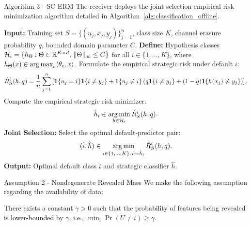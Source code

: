 \begin{sourceblock}{Algorithm 3 - SC-ERM}
The receiver deploys the joint selection empirical risk minimization algorithm detailed in Algorithm~\ref{alg:classification_offline}.

\begin{algorithm}[htbp]
\caption{Strategic Classification Empirical Risk Minimization (SC-ERM)}
\label{alg:classification_offline}
\begin{algorithmic}[1]
\State \textbf{Input:} Training set $S = \{(u_j, x_j, y_j)\}_{j=1}^n$, class size $K$, channel erasure probability $q$, bounded domain parameter $C$.
\State \textbf{Define:} Hypothesis classes $\mathcal{H}_i = \{h_{\Theta} : \Theta \in \mathbb{R}^{K \times d}, \, \|\Theta\|_\infty \le C\}$ for all $i \in \{1,\dots,K\}$, where $h_{\Theta}(x) \in \operatorname*{arg\,max}_c \langle \theta_c, x \rangle$.
    \State Formulate the empirical strategic risk under default $i$:
    \begin{equation*}
        \hat{R}^i_S(h, q) = \frac{1}{n}\sum_{j=1}^n \left[ \mathbf{1}\{u_j = i\}\mathbf{1}\{i \ne y_j\} + \mathbf{1}\{u_j \ne i\} \left( q\mathbf{1}\{i \ne y_j\} + (1 - q)\mathbf{1}\{h(x_j) \ne y_j\} \right) \right].
    \end{equation*}
    \State Compute the empirical strategic risk minimizer:
    \begin{equation*}
        \hat{h}_i \in \operatorname*{arg\,min}_{h \in \mathcal{H}_i} \hat{R}^i_S(h, q).
    \end{equation*}
\EndFor
\State \textbf{Joint Selection:} Select the optimal default-predictor pair:
\begin{equation*}
    (\hat{i}, \hat{h}) \in \operatorname*{arg\,min}_{i \in \{1, \dots, K\}, \, h = \hat{h}_i} \hat{R}^i_S(h, q).
\end{equation*}
\State \textbf{Output:} Optimal default class $\hat{i}$ and strategic classifier $\hat{h}$.
\end{algorithmic}
\end{algorithm}
\end{sourceblock}

\begin{faqblock}
\faqanswers
{}
\end{faqblock}

\begin{sourceblock}{Assumption 2 - Nondegenerate Revealed Mass}
We make the following assumption regarding the availability of data:
\begin{assumption}
\label{ass:nondegenerate_mass}
There exists a constant $\gamma > 0$ such that the probability of features being revealed is lower-bounded by $\gamma$, i.e., $\min_{i} \Pr(U \ne i) \ge \gamma$.
\end{assumption}
\end{sourceblock}

